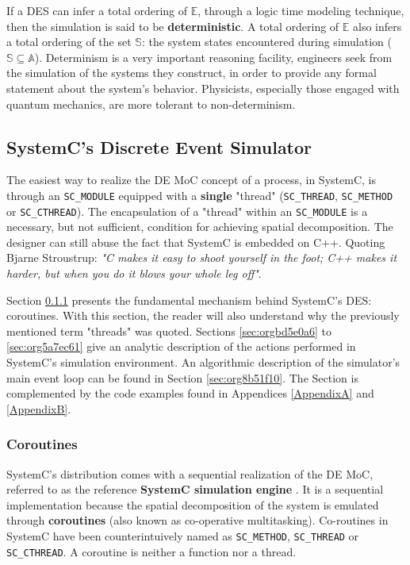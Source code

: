 \documentclass[11pt]{article}
\begin{document}
If a DES can infer a total ordering of \(\mathds{E}\), through a logic time modeling technique, then the simulation is said to be \textbf{deterministic}.
A total ordering of \(\mathds{E}\) also infers a total ordering of the set \(\mathds{S}\): the system states encountered during simulation (\(\mathds{S} \subseteq \mathds{A}\)).
Determinism is a very important reasoning facility, engineers seek from the simulation of the systems they construct, in order to provide any formal statement about the system's behavior.
Physicists, especially those engaged with quantum mechanics, are more tolerant to non-determinism.

\clearpage

\subsection{SystemC's Discrete Event Simulator}
\label{sec:org26c917d}
The easiest way to realize the DE MoC concept of a process, in SystemC, is through an \texttt{SC\_MODULE} equipped with a \textbf{single} "thread" (\texttt{SC\_THREAD}, \texttt{SC\_METHOD} or \texttt{SC\_CTHREAD}). 
The encapsulation of a "thread" within an \texttt{SC\_MODULE} is a necessary, but not sufficient, condition for achieving spatial decomposition.
The designer can still abuse the fact that SystemC is embedded on C++.
Quoting Bjarne Stroustrup: \textit{"C makes it easy to shoot yourself in the foot; C++ makes it harder, but when you do it blows your whole leg off"}.

Section \ref{sec:orge02c483} presents the fundamental mechanism behind SystemC's DES: coroutines.
With this section, the reader will also understand why the previously mentioned term "threads" was quoted.
Sections \ref{sec:orgbd5e0a6} to \ref{sec:org5a7ec61} give an analytic description of the actions performed in SystemC's simulation environment.
An algorithmic description of the simulator's main event loop can be found in Section \ref{sec:org8b51f10}.
The Section is complemented by the code examples found in Appendices \ref{AppendixA} and \ref{AppendixB}.

\subsubsection{Coroutines}
\label{sec:orge02c483}
SystemC's distribution comes with a sequential realization of the DE MoC, referred to as the reference \textbf{SystemC simulation engine} \cite{OpenSystemCInitiative2012}.
It is a sequential implementation because the spatial decomposition of the system is emulated through \textbf{coroutines} (also known as co-operative multitasking). 
Co-routines in SystemC have been counterintuively named as \texttt{SC\_METHOD}, \texttt{SC\_THREAD} or \texttt{SC\_CTHREAD}.
A coroutine is neither a function nor a thread.
\end{document}
